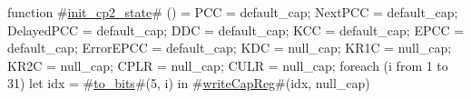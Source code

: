 function #\hyperref[sailMIPSzinitzycp2zystate]{init\_cp2\_state}# () = {
  PCC = default_cap;
  NextPCC = default_cap;
  DelayedPCC = default_cap;
  DDC  = default_cap;
  KCC  = default_cap;
  EPCC = default_cap;
  ErrorEPCC = default_cap;
  KDC  = null_cap;
  KR1C = null_cap;
  KR2C = null_cap;
  CPLR = null_cap;
  CULR = null_cap;
  foreach (i from 1 to 31) {
    let idx = #\hyperref[sailMIPSztozybits]{to\_bits}#(5, i) in
    #\hyperref[sailMIPSzwriteCapReg]{writeCapReg}#(idx, null_cap)
  }
}
